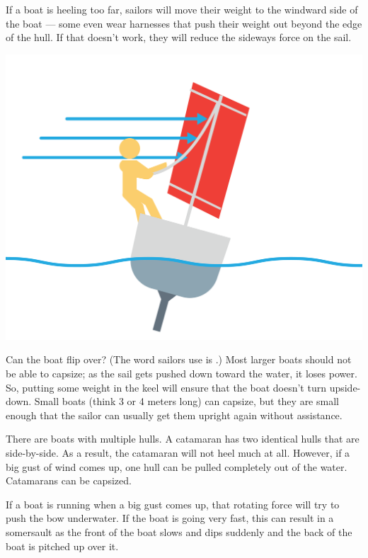 If a boat is heeling too far,  sailors will move their weight to the windward side of the boat --- some even wear harnesses that push their weight out beyond the edge of the hull.  
If that doesn't work, they will reduce the sideways force on the sail.

\begin{center}
    \includegraphics[width=.75\textwidth]{heeling2.png}
    
\end{center}

Can the boat flip over?  (The word sailors use is .)  Most larger boats should not be able to capsize; as the sail gets pushed down toward the water, it loses power.  So, putting some weight in the keel will ensure that the boat doesn't turn upside-down.  Small boats (think 3 or 4 meters long) can capsize,  but they are small enough that the sailor can usually
get them upright again without assistance.

There are boats with multiple hulls. A catamaran has two identical hulls that are side-by-side.  As a result,  the catamaran will not heel much at all.  However,  if a big gust of wind comes up, one hull can be pulled completely out of the water.  Catamarans can be capsized.

If a boat is running when a big gust comes up,  that rotating force will try to push the bow underwater. If the boat is going very fast,  this can result in a somersault as 
the front of the boat slows and dips suddenly and the back of the boat is pitched up over it.


